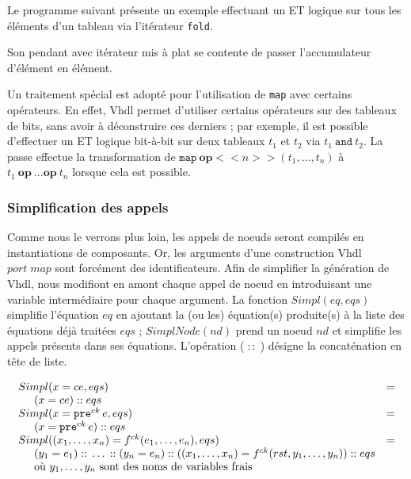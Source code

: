 \documentclass[a4paper]{article}
\newcommand{\vhdl}{{\sc Vhdl}}
\newcommand{\mybox}[1]{\mbox{\tt{#1}}}
\newcommand{\ind}[0]{\hspace{0.5cm}}
\newcommand{\Cons}[0]{\; \mathbf{::} \;}
\newcommand{\Pre}[1]{\mybox{pre}^{ck} \, #1}
\newcommand{\App}[2]{#1^{ck}(#2)}
\begin{document}
Le programme suivant pr\'esente un exemple effectuant un ET logique sur tous les
\'el\'ements d'un tableau via l'it\'erateur \texttt{fold}.



Son pendant avec it\'erateur mis \`a plat se contente de passer l'accumulateur
d'\'el\'ement en \'el\'ement.



Un traitement sp\'ecial est adopt\'e pour l'utilisation de \texttt{map} avec
certains op\'erateurs. En effet, \vhdl{} permet d'utiliser certains op\'erateurs sur
des tableaux de bits, sans avoir \`a d\'econstruire ces derniers ; par exemple, il
est possible d'effectuer un ET logique bit-\`a-bit sur deux tableaux $t_1$ et
$t_2$ via $t_1 \ \texttt{and} \ t_2$. La passe effectue la transformation de
$\texttt{map}\ \textbf{op}<<n>>(t_1,\dots,t_n)$ \`a $t_1\ \textbf{op}\ \dots
\textbf{op}\ t_n$ lorsque cela est possible.

\subsubsection{Simplification des appels}

\newcommand{\simpl}[2]{Simpl(#1,#2)}
\newcommand{\simplnd}[1]{SimplNode(#1)}

Comme nous le verrons plus loin, les appels de noeuds seront compil\'es
en instantiations de composants. Or, les arguments d'une construction
\vhdl{} $port \; map$ sont forc\'ement des identificateurs. Afin de
simplifier la g\'en\'eration de \vhdl{}, nous modifiont en amont chaque
appel de noeud en introduisant une variable interm\'ediaire pour chaque
argument. La fonction $\simpl{eq}{eqs}$ simplifie l'\'equation $eq$ en
ajoutant la (ou les) \'equation(s) produite(s) \`a la liste des \'equations
d\'ej\`a trait\'ees $eqs$ ; $\simplnd{nd}$ prend un noeud $nd$ et simplifie
les appels pr\'esents dans ses \'equations. L'op\'eration ($\Cons$) d\'esigne
la concat\'enation en t\^ete de liste.

\[
\begin{array}{ll}
  \simpl{x = ce}{eqs} & = \\
  \ind (x = ce) \Cons eqs \\
  \simpl{x = \Pre{e}}{eqs} & = \\
  \ind (x = \Pre{e}) \Cons eqs \\

  \simpl{(x_1,\dots,x_n) = \App{f}{e_1,\dots,e_n}}{eqs} & = \\
  \ind (y_1 = e_1) \Cons \dots \Cons (y_n = e_n)
  \Cons ((x_1,\dots,x_n) = \App{f}{rst,y_1,\dots,y_n}) \Cons eqs \\
  \ind \mbox{o\`u } y_1,\dots,y_n \mbox{ sont des noms de variables frais}
\end{array}
\]
\end{document}
